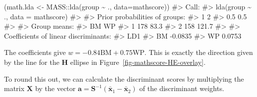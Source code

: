 \documentclass[
  letterpaper,
  10pt,
  krantz2]{krantz}
\makeatletter
\newenvironment{Shaded}{\begin{snugshade}}{\end{snugshade}}
\newcommand{\AttributeTok}[1]{\textcolor[rgb]{0.40,0.45,0.13}{#1}}
\newcommand{\CommentTok}[1]{\textcolor[rgb]{0.37,0.37,0.37}{#1}}
\newcommand{\DecValTok}[1]{\textcolor[rgb]{0.68,0.00,0.00}{#1}}
\newcommand{\FunctionTok}[1]{\textcolor[rgb]{0.28,0.35,0.67}{#1}}
\newcommand{\NormalTok}[1]{\textcolor[rgb]{0.00,0.23,0.31}{#1}}
\newcommand{\OtherTok}[1]{\textcolor[rgb]{0.00,0.23,0.31}{#1}}
\newcommand{\SpecialCharTok}[1]{\textcolor[rgb]{0.37,0.37,0.37}{#1}}
\newenvironment{kframe}{%
  \medskip{}
  \setlength{\fboxsep}{.8em}
  \def\at@end@of@kframe{}%
  \ifinner\ifhmode%
  \def\at@end@of@kframe{\end{minipage}}%
  \begin{minipage}{\columnwidth}%
  \fi\fi%
  \def\FrameCommand##1{\hskip\@totalleftmargin \hskip-\fboxsep
  \colorbox{shadecolor}{##1}\hskip-\fboxsep
      \hskip-\linewidth \hskip-\@totalleftmargin \hskip\columnwidth}%
  \MakeFramed {\advance\hsize-\width
    \@totalleftmargin\z@ \linewidth\hsize
    \@setminipage}}%
{\par\unskip\endMakeFramed%
  \at@end@of@kframe}
\renewenvironment{Shaded}{\begin{kframe}}{\end{kframe}}
\makeatother
\begin{document}
\begin{Shaded}
\begin{Highlighting}[]
\NormalTok{(math.lda }\OtherTok{\textless{}{-}}\NormalTok{ MASS}\SpecialCharTok{::}\FunctionTok{lda}\NormalTok{(group }\SpecialCharTok{\textasciitilde{}}\NormalTok{ ., }\AttributeTok{data=}\NormalTok{mathscore))}
\CommentTok{\#\textgreater{} Call:}
\CommentTok{\#\textgreater{} lda(group \textasciitilde{} ., data = mathscore)}
\CommentTok{\#\textgreater{} }
\CommentTok{\#\textgreater{} Prior probabilities of groups:}
\CommentTok{\#\textgreater{}   1   2 }
\CommentTok{\#\textgreater{} 0.5 0.5 }
\CommentTok{\#\textgreater{} }
\CommentTok{\#\textgreater{} Group means:}
\CommentTok{\#\textgreater{}    BM    WP}
\CommentTok{\#\textgreater{} 1 178  83.3}
\CommentTok{\#\textgreater{} 2 158 121.7}
\CommentTok{\#\textgreater{} }
\CommentTok{\#\textgreater{} Coefficients of linear discriminants:}
\CommentTok{\#\textgreater{}        LD1}
\CommentTok{\#\textgreater{} BM {-}0.0835}
\CommentTok{\#\textgreater{} WP  0.0753}
\end{Highlighting}
\end{Shaded}

The coefficients give \(w = -0.84 \text{BM} + 0.75 \text{WP}\). This is
exactly the direction given by the line for the \(\mathbf{H}\) ellipse
in Figure~\ref{fig-mathscore-HE-overlay}.

To round this out, we can calculate the discriminant scores by
multiplying the matrix \(\mathbf{X}\) by the vector
\(\mathbf{a} = \mathbf{S}^{-1} (\bar{\mathbf{x}}_1 - \bar{\mathbf{x}}_2)\)
of the discriminant weights.

\begin{Shaded}
\end{Shaded}
\end{document}
